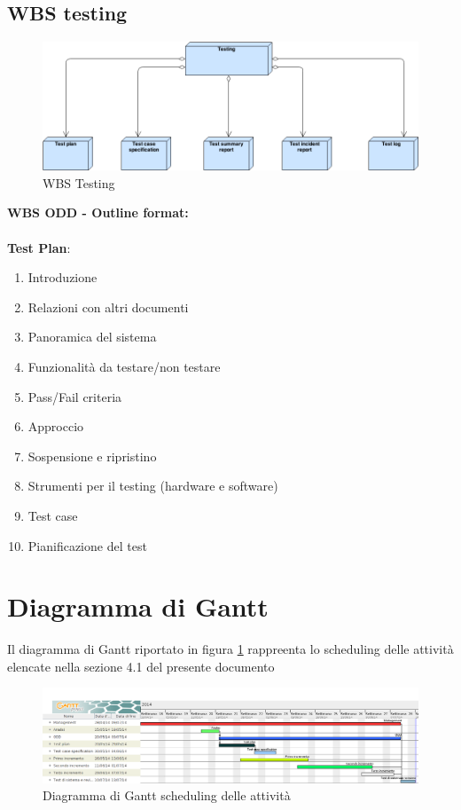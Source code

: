 \subsection{WBS testing}
\begin{figure}[ht]
\centering
\includegraphics[width=\textwidth]{img/WBS_testing.png}
\caption{WBS Testing} 
\end{figure}
\textbf{WBS ODD - Outline format:}\\ \\
\textbf{Test Plan}:
\begin{enumerate}
\item Introduzione
\item Relazioni con altri documenti
\item Panoramica del sistema
\item Funzionalità da testare/non testare
\item Pass/Fail criteria
\item Approccio
\item Sospensione e ripristino
\item Strumenti per il testing (hardware e software)
\item Test case
\item Pianificazione del test
\end{enumerate}
\clearpage

\section{Diagramma di Gantt}
Il diagramma di Gantt riportato in figura \ref{gantMain} rappreenta lo scheduling delle attività elencate nella sezione 4.1 del presente documento
\begin{figure}[ht]
\centering
\includegraphics[width=\textwidth]{Gantt/Generic2.png} 
\caption{Diagramma di Gantt scheduling delle attività}
\label{gantMain}
\end{figure}

